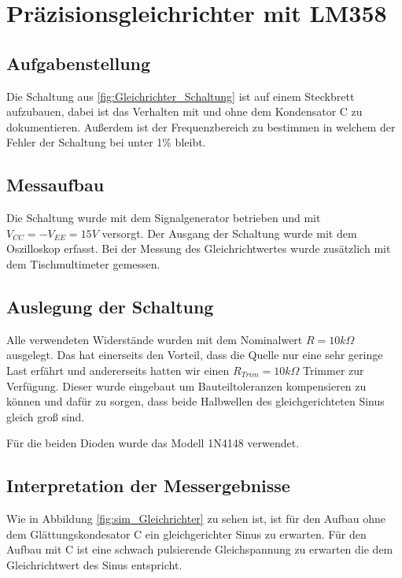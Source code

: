 \section{Präzisionsgleichrichter mit LM358}
\subsection{Aufgabenstellung}
Die Schaltung aus \autoref{fig:Gleichrichter_Schaltung} ist auf einem Steckbrett aufzubauen, dabei ist das Verhalten mit und ohne dem Kondensator C zu dokumentieren. Außerdem ist der Frequenzbereich zu bestimmen in welchem der Fehler der Schaltung bei unter 1\% bleibt.

\subsection{Messaufbau}
Die Schaltung wurde mit dem Signalgenerator betrieben und mit $V_{CC} = -V_{EE} = 15V$ versorgt. Der Ausgang der Schaltung wurde mit dem Oszilloskop erfasst. Bei der Messung des Gleichrichtwertes wurde zusätzlich mit dem Tischmultimeter gemessen.
\subsection{Auslegung der Schaltung}
Alle verwendeten Widerstände wurden mit dem Nominalwert $R=10k\Omega$ ausgelegt. Das hat einerseits den Vorteil, dass die Quelle nur eine sehr geringe Last erfährt und andererseits hatten wir einen $R_{Trim} = 10k\Omega$ Trimmer zur Verfügung. Dieser wurde eingebaut um Bauteiltoleranzen kompensieren zu können und dafür zu sorgen, dass beide Halbwellen des gleichgerichteten Sinus gleich groß sind.

Für die beiden Dioden wurde das Modell 1N4148 verwendet.
\subsection{Interpretation der Messergebnisse}
Wie in Abbildung \ref{fig:sim_Gleichrichter} zu sehen ist, ist für den Aufbau ohne dem Glättungskondesator C ein gleichgerichter Sinus zu erwarten. Für den Aufbau mit C ist eine schwach pulsierende Gleichspannung zu erwarten die dem Gleichrichtwert des Sinus entspricht.
